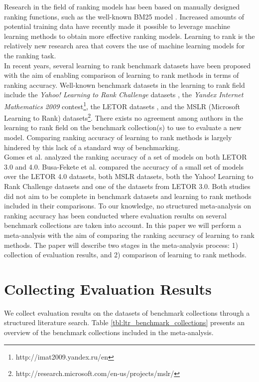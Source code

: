 \documentclass{sig-alternate}
\begin{document}
Research in the field of ranking models has been based on manually designed ranking functions, such as the well-known BM25 model \cite{Robertson1994}. Increased amounts of potential training data have recently made it possible to leverage machine learning methods to obtain more effective ranking models. Learning to rank is the relatively new research area that covers the use of machine learning models for the ranking task.\\

In recent years, several learning to rank benchmark datasets have been proposed with the aim of enabling comparison of learning to rank methods in terms of ranking accuracy. Well-known benchmark datasets in the learning to rank field include the \emph{Yahoo! Learning to Rank Challenge} datasets \cite{Chapelle2011a}, the \emph{Yandex Internet Mathematics 2009} contest\footnote{http://imat2009.yandex.ru/en}, the LETOR datasets \cite{Qin2010}, and the MSLR (Microsoft Learning to Rank) datasets\footnote{http://research.microsoft.com/en-us/projects/mslr/}. There exists no agreement among authors in the learning to rank field on the benchmark collection(s) to use to evaluate a new model. Comparing ranking accuracy of learning to rank methods is largely hindered by this lack of a standard way of benchmarking.\\

Gomes et al. \cite{Gomes2013} analyzed the ranking accuracy of a set of models on both LETOR 3.0 and 4.0. Busa-Fekete et al. \cite{Busa-Fekete2013} compared the accuracy of a small set of models over the LETOR 4.0 datasets, both MSLR datasets, both the Yahoo! Learning to Rank Challenge datasets and one of the datasets from LETOR 3.0. Both studies did not aim to be complete in benchmark datasets and learning to rank methods included in their comparisons. To our knowledge, no structured meta-analysis on ranking accuracy has been conducted where evaluation results on several benchmark collections are taken into account. In this paper we will perform a meta-analysis with the aim of comparing the ranking accuracy of learning to rank methods. The paper will describe two stages in the meta-analysis process: 1) collection of evaluation results, and 2) comparison of learning to rank methods.

\section{Collecting Evaluation Results}
\label{sec:collecting_evaluation_results}
We collect evaluation results on the datasets of benchmark collections through a structured literature search. Table \ref{tbl:ltr_benchmark_collections} presents an overview of the benchmark collections included in the meta-analysis.
\end{document}
